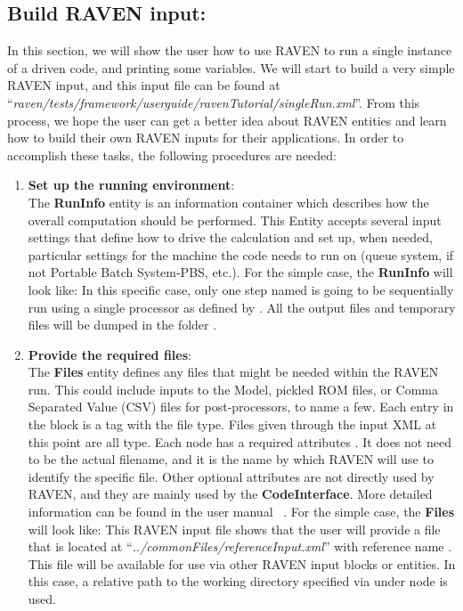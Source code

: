 \subsection{Build RAVEN input: }
\label{sub:singleRun}
In this section, we will show the user how to use RAVEN to run a single instance of a driven code, and
printing some variables. 
We will start to build a very simple RAVEN input, and this input file can be found at 
``\textit{raven/tests/framework/user\textunderscore guide/ravenTutorial/singleRun.xml}''. 
From this process, we hope the user can get a better idea about
RAVEN entities and learn how to build their own RAVEN inputs for their applications.
In order to accomplish these tasks, the following procedures are needed:
\begin{enumerate}
   \item \textbf{Set up the running environment}: 
     \\The \textbf{RunInfo} entity is an information container which describes how the overall computation should
      be performed. This Entity accepts several input settings that define how to drive the calculation and set up,
      when needed, particular settings for the machine the code needs to run on (queue system, if not Portable
      Batch System-PBS, etc.). For the simple case, the \textbf{RunInfo} will look like:
      In this specific case, only one step named  is going to be sequentially run using a single
      processor as defined by . All the output files and temporary files will be dumped in the
      folder .

   \item \textbf{Provide the required files}: 
     \\ The \textbf{Files} entity  defines any files that might be needed within the RAVEN run. This could include
     inputs to the Model, pickled ROM files, or Comma Separated Value (CSV) files for post-processors, to name a few.
     Each entry in the  block is a tag with the file type. Files given through the input XML at this
     point are all  type. Each  node has a required attributes . It does
     not need to be the actual filename, and it is the name by which RAVEN will use to identify the specific file. Other
     optional attributes are not directly used by RAVEN, and they are mainly used by the \textbf{CodeInterface}. More
     detailed information can be found in the user manual ~\cite{RAVENuserManual}. For the simple case, the \textbf{Files}
     will look like:
     This RAVEN input file shows that the user will provide a file that is located at ``\textit{../commonFiles/referenceInput.xml}''
     with reference name . This file will be available for use via other RAVEN input blocks or entities.
     In this case, a relative path to the working directory specified via  under node 
     is used.


\end{enumerate}
